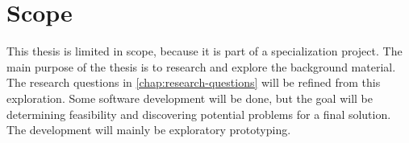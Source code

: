 \section{Scope}

This thesis is limited in scope, because it is part of a specialization project.
The main purpose of the thesis is to research and explore the background material. The research questions in \cref{chap:research-questions} will be refined from this exploration.
Some software development will be done, but the goal will be determining feasibility and discovering potential problems for a final solution.
The development will mainly be exploratory prototyping.
